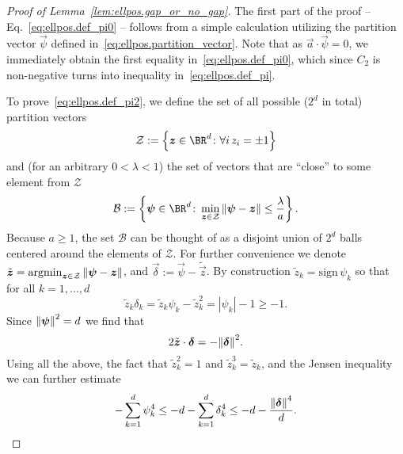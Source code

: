 \begin{proof}[Proof of Lemma~\ref{lem:ellpos.gap_or_no_gap}]
  The first part of the proof -- Eq.~\eqref{eq:ellpos.def_pi0} --  follows from a simple calculation utilizing the partition vector $\vec\psi$ defined in~\eqref{eq:ellpos.partition_vector}. Note that as $\vec a \cdot\vec \psi=0$, we immediately obtain the first equality in~\eqref{eq:ellpos.def_pi0}, which since $C_2$ is non-negative turns into inequality in~\eqref{eq:ellpos.def_pi}.

  To prove~\eqref{eq:ellpos.def_pi2}, we define the set of all possible ($2^d$ in total) partition vectors
  \begin{equation}
    \mathcal{Z} := \left\{ \vec z \in \BR^d\colon \forall i \, z_i = \pm 1 \right\}
  \end{equation}
  and (for an arbitrary $0<\lambda<1$) the set of vectors that are ``close'' to some element from $\mathcal{Z}$
  \begin{equation}
    \mathcal{B} := \left\{ \vec\psi\in\BR^d\colon \min_{\vec z\in \mathcal{Z}} \norm{\vec\psi - \vec z} \leq \frac{\lambda}{a} \right\}.
  \end{equation}
Because $a \geq 1$, the set $\mathcal{B}$ can be thought of as a disjoint union of $2^d$ balls centered around the elements of $\mathcal{Z}$.
For further convenience we denote $\tilde{{\boldsymbol{z}}} = \mathrm{argmin}_{{\boldsymbol{z}}\in\mathcal{Z}} \, {\Vert{\boldsymbol{\psi}} - {\boldsymbol{z}}\Vert}$, and $\vec\delta := \vec\psi - \tilde{\vec{z}}$.
By construction $\tilde{z}_k=\mathrm{sign}\,\psi_k$ so that for all $k=1,\ldots,d$
\begin{equation}
\tilde{z}_k\delta_k=\tilde{z}_k\psi_k-\tilde{z}_k^2=|\psi_k|-1\geq-1.
\end{equation}
Since ${\Vert{\boldsymbol{\psi}}\Vert}^2=d$ we find that
  \begin{equation}
    2\tilde{{\boldsymbol{z}}} \cdot{\boldsymbol{\delta}} = - {\Vert{\boldsymbol{\delta}}\Vert}^2.
  \end{equation}
Using all the above, the fact that $\tilde{z}_k^2=1$ and  $\tilde{z}_k^3=\tilde{z}_k$, and the Jensen inequality we can further estimate
\begin{equation}
-\sum_{k=1}^d \psi_k^4\leq-d-\sum_{k=1}^d \delta_k^4\leq-d-\frac{{\Vert{\boldsymbol{\delta}}\Vert}^4}{d}.
\end{equation}


\end{proof}
